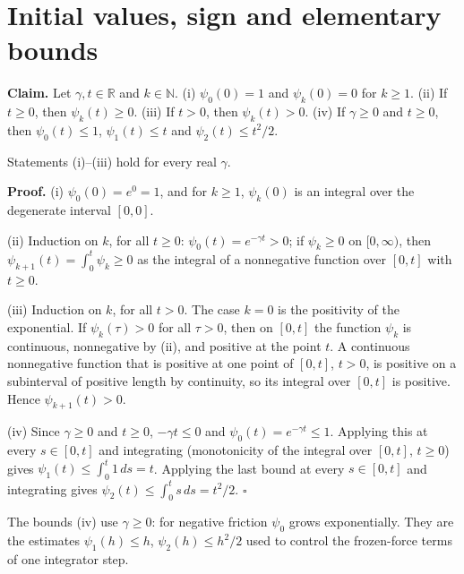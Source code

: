\documentclass[11pt,a4paper]{article}
\begin{document}
\section{\texorpdfstring{Initial values, sign and elementary bounds}{Initial values, sign and elementary bounds}}


\textbf{Claim.} Let \(\gamma,t\in\mathbb R\) and \(k\in\mathbb N\).
(i) \(\psi_0(0)=1\) and \(\psi_k(0)=0\) for \(k\ge1\).
(ii) If \(t\ge0\), then \(\psi_k(t)\ge0\).
(iii) If \(t>0\), then \(\psi_k(t)>0\).
(iv) If \(\gamma\ge0\) and \(t\ge0\), then \(\psi_0(t)\le1\), \(\psi_1(t)\le t\) and \(\psi_2(t)\le t^2/2\).




Statements (i)–(iii) hold for every real \(\gamma\).




\textbf{Proof.} (i) \(\psi_0(0)=e^0=1\), and for \(k\ge1\), \(\psi_k(0)\) is an integral over the degenerate interval \([0,0]\).




(ii) Induction on \(k\), for all \(t\ge0\): \(\psi_0(t)=e^{-\gamma t}>0\); if \(\psi_k\ge0\) on \([0,\infty)\), then \(\psi_{k+1}(t)=\int_0^t\psi_k\ge0\) as the integral of a nonnegative function over \([0,t]\) with \(t\ge0\).




(iii) Induction on \(k\), for all \(t>0\). The case \(k=0\) is the positivity of the exponential. If \(\psi_k(\tau)>0\) for all \(\tau>0\), then on \([0,t]\) the function \(\psi_k\) is continuous, nonnegative by (ii), and positive at the point \(t\). A continuous nonnegative function that is positive at one point of \([0,t]\), \(t>0\), is positive on a subinterval of positive length by continuity, so its integral over \([0,t]\) is positive. Hence \(\psi_{k+1}(t)>0\).




(iv) Since \(\gamma\ge0\) and \(t\ge0\), \(-\gamma t\le0\) and \(\psi_0(t)=e^{-\gamma t}\le1\). Applying this at every \(s\in[0,t]\) and integrating (monotonicity of the integral over \([0,t]\), \(t\ge0\)) gives \(\psi_1(t)\le\int_0^t1\,ds=t\). Applying the last bound at every \(s\in[0,t]\) and integrating gives \(\psi_2(t)\le\int_0^ts\,ds=t^2/2\). \(\square\)




The bounds (iv) use \(\gamma\ge0\): for negative friction \(\psi_0\) grows exponentially. They are the estimates \(\psi_1(h)\le h\), \(\psi_2(h)\le h^2/2\) used to control the frozen-force terms of one integrator step.
\end{document}
